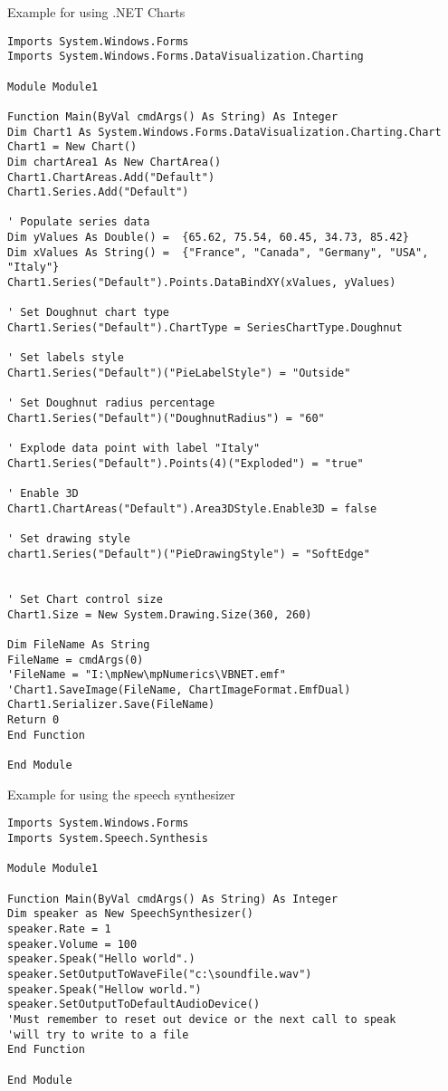 \newpage
\noindent Example for using .NET Charts


\begin{lstlisting}
Imports System.Windows.Forms
Imports System.Windows.Forms.DataVisualization.Charting

Module Module1

Function Main(ByVal cmdArgs() As String) As Integer
Dim Chart1 As System.Windows.Forms.DataVisualization.Charting.Chart
Chart1 = New Chart()
Dim chartArea1 As New ChartArea()
Chart1.ChartAreas.Add("Default")
Chart1.Series.Add("Default")  

' Populate series data
Dim yValues As Double() =  {65.62, 75.54, 60.45, 34.73, 85.42}
Dim xValues As String() =  {"France", "Canada", "Germany", "USA", "Italy"}
Chart1.Series("Default").Points.DataBindXY(xValues, yValues)

' Set Doughnut chart type
Chart1.Series("Default").ChartType = SeriesChartType.Doughnut

' Set labels style
Chart1.Series("Default")("PieLabelStyle") = "Outside"

' Set Doughnut radius percentage
Chart1.Series("Default")("DoughnutRadius") = "60"

' Explode data point with label "Italy"
Chart1.Series("Default").Points(4)("Exploded") = "true"

' Enable 3D
Chart1.ChartAreas("Default").Area3DStyle.Enable3D = false

' Set drawing style
chart1.Series("Default")("PieDrawingStyle") = "SoftEdge"


' Set Chart control size
Chart1.Size = New System.Drawing.Size(360, 260)

Dim FileName As String
FileName = cmdArgs(0)
'FileName = "I:\mpNew\mpNumerics\VBNET.emf"
'Chart1.SaveImage(FileName, ChartImageFormat.EmfDual)
Chart1.Serializer.Save(FileName)    
Return 0
End Function

End Module
\end{lstlisting}



\newpage
\noindent Example for using the speech synthesizer


\begin{lstlisting}
Imports System.Windows.Forms
Imports System.Speech.Synthesis 

Module Module1

Function Main(ByVal cmdArgs() As String) As Integer
Dim speaker as New SpeechSynthesizer()
speaker.Rate = 1
speaker.Volume = 100
speaker.Speak("Hello world".)
speaker.SetOutputToWaveFile("c:\soundfile.wav")
speaker.Speak("Hellow world.")
speaker.SetOutputToDefaultAudioDevice()
'Must remember to reset out device or the next call to speak 
'will try to write to a file
End Function

End Module
\end{lstlisting}




